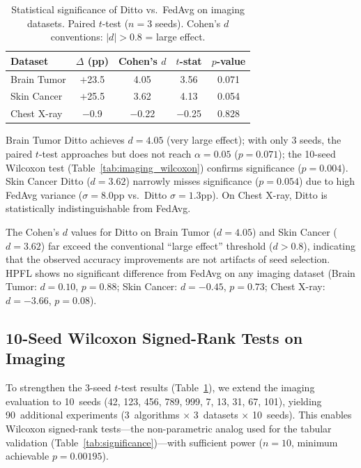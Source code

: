 \documentclass[conference]{IEEEtran}
\begin{document}
\begin{table}[htbp]
\centering
\caption{Statistical significance of Ditto vs.\ FedAvg on imaging datasets. Paired $t$-test ($n{=}3$ seeds). Cohen's $d$ conventions: $|d|{>}0.8$ = large effect.}
\label{tab:imaging_significance}
\small
\begin{tabular}{lcccc}
\toprule
\textbf{Dataset} & \textbf{$\Delta$ (pp)} & \textbf{Cohen's $d$} & \textbf{$t$-stat} & \textbf{$p$-value} \\
\midrule
Brain Tumor & $+$23.5 & 4.05 & 3.56 & 0.071 \\
Skin Cancer & $+$25.5 & 3.62 & 4.13 & 0.054 \\
Chest X-ray & $-$0.9 & $-$0.22 & $-$0.25 & 0.828 \\
\bottomrule
\end{tabular}
\par{\footnotesize Brain Tumor Ditto achieves $d{=}4.05$ (very large effect); with only 3 seeds, the paired $t$-test approaches but does not reach $\alpha{=}0.05$ ($p{=}0.071$); the 10-seed Wilcoxon test (Table~\ref{tab:imaging_wilcoxon}) confirms significance ($p{=}0.004$). Skin Cancer Ditto ($d{=}3.62$) narrowly misses significance ($p{=}0.054$) due to high FedAvg variance ($\sigma{=}8.0$pp vs.\ Ditto $\sigma{=}1.3$pp). On Chest X-ray, Ditto is statistically indistinguishable from FedAvg.}
\end{table}

The Cohen's $d$ values for Ditto on Brain Tumor ($d{=}4.05$) and Skin Cancer ($d{=}3.62$) far exceed the conventional ``large effect'' threshold ($d{>}0.8$), indicating that the observed accuracy improvements are not artifacts of seed selection. HPFL shows no significant difference from FedAvg on any imaging dataset (Brain Tumor: $d{=}0.10$, $p{=}0.88$; Skin Cancer: $d{=}-0.45$, $p{=}0.73$; Chest X-ray: $d{=}-3.66$, $p{=}0.08$).


\subsection{10-Seed Wilcoxon Signed-Rank Tests on Imaging}
\label{sec:imaging_wilcoxon}

To strengthen the 3-seed $t$-test results (Table~\ref{tab:imaging_significance}), we extend the imaging evaluation to 10~seeds (42, 123, 456, 789, 999, 7, 13, 31, 67, 101), yielding 90~additional experiments (3~algorithms $\times$ 3~datasets $\times$ 10~seeds). This enables Wilcoxon signed-rank tests---the non-parametric analog used for the tabular validation (Table~\ref{tab:significance})---with sufficient power ($n{=}10$, minimum achievable $p = 0.00195$).
\end{document}
